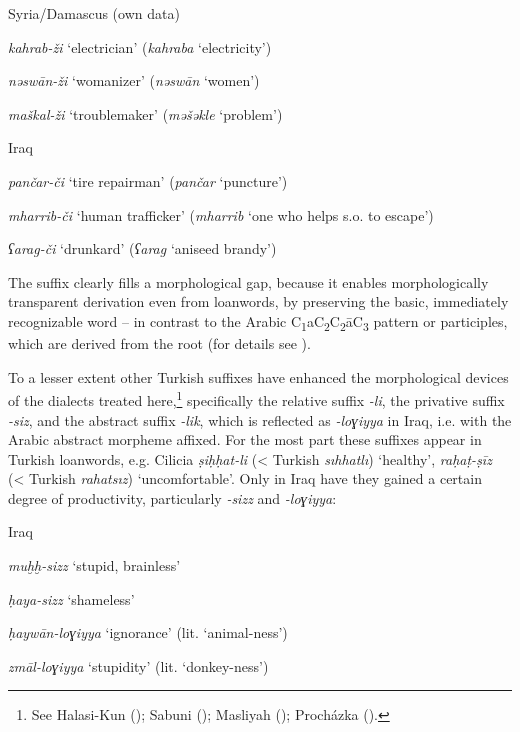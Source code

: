 \documentclass[output=paper]{langsci/langscibook}
\begin{document}
\ea\label{kahrab}
Syria/Damascus (own data)

\textit{kahrab-ži} ‘electrician’ (\textit{kahraba} ‘electricity’)

\textit{nəswān-ži} ‘womanizer’ (\textit{nəswān} ‘women’)

\textit{maškal-ži} ‘troublemaker’ (\textit{məšəkle} ‘problem’)
\z

\ea\label{pancar}
Iraq \citep[40--44]{Procházka-Eisl2018}

\textit{pančar-či} ‘tire repairman’ (\textit{pančar} ‘puncture’)

\textit{mharrib-či} ‘human trafficker’ (\textit{mharrib} ‘one who helps s.o. to escape’)

\textit{ʕarag-či} ‘drunkard’ (\textit{ʕarag} ‘aniseed brandy’)
\z

The suffix clearly fills a morphological gap, because it enables morphologically transparent derivation even from loanwords, by preserving the basic, immediately recognizable word – in contrast to the Arabic C\textsubscript{1}aC\textsubscript{2}C\textsubscript{2}āC\textsubscript{3}{} pattern or participles, which are derived from the root (for details see \citealt{Procházka-Eisl2018}).

To a lesser extent other Turkish suffixes have enhanced the morphological devices of the dialects treated here,\footnote{See Halasi-Kun (\citeyear[68--71]{Halasi-Kun1969}); Sabuni (\citeyear[168]{Sabuni1980}); Masliyah (\citeyear{Masliyah1996}); Procházka (\citeyear[186]{Procházka2002Cukurova}).} specifically the relative suffix \textit{-li}, the privative suffix \textit{-siz}, and the abstract suffix \textit{-lik}, which is reflected as \textit{-loɣiyya} in Iraq, i.e. with the Arabic abstract morpheme affixed. For the most part these suffixes appear in Turkish loanwords, e.g. Cilicia \textit{ṣiḥḥat-li} (< Turkish \textit{sıhhatlı}) ‘healthy’, \textit{raḥaṭ-ṣīz} (< Turkish \textit{rahatsız}) ‘uncomfortable’. Only in Iraq have they gained a certain degree of productivity, particularly \textit{-sizz} and \textit{-loɣiyya}:

\ea
Iraq \citep[293--294]{Masliyah1996} 

\textit{muḫḫ-sizz} ‘stupid, brainless’

\textit{ḥaya-sizz} ‘shameless’

\textit{ḥaywān-loɣiyya} ‘ignorance’ (lit. ‘animal-ness’)

\textit{zmāl-loɣiyya} ‘stupidity’ (lit. ‘donkey-ness’)
\z
\end{document}

